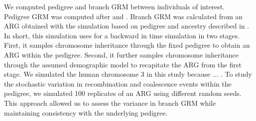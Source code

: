 \begin{table}
  \centering
  \caption{Selected regions and parishes from the BALSAC French-Canadian Pedigree}
  \renewcommand{\arraystretch}{1.2}
  \label{tab:parishes}
\end{table}

We computed pedigree and branch GRM between individuals of interest.
%
Pedigree GRM was computed after
\citet{lange1992calculation} and \citet{colleau2002indirect}.
%
Branch GRM was calculated from an ARG
obtained with the simulation based on pedigree and ancestry
described in \citet{andersontrocme2023genes}.
%
In short, this simulation uses \msprime{} \citep{baumdicker2022efficient} 
for a backward in time simulation in two stages.
%
First, it samples chromosome inheritance through the fixed pedigree
to obtain an ARG within the pedigree.
%
Second, it further samples chromosome inheritance through the assumed demographic model
to recapitate the ARG from the first stage.
%
We simulated the human chromosome 3 in this study because ... .
%
To study the stochastic variation in recombination and coalescence events within the pedigree,
we simulated 100 replicates of an ARG using different random seeds.
%
This approach allowed us to assess the variance in branch GRM
while maintaining consistency with the underlying pedigree.

